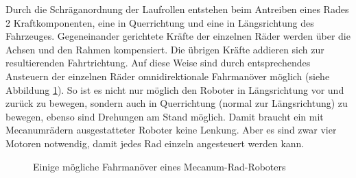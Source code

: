 \documentclass[a4paper,bibtotoc,oneside]{scrbook}
\begin{document}
Durch die Schräganordnung der Laufrollen entstehen beim Antreiben eines Rades 2 Kraftkomponenten, eine in Querrichtung und eine in Längsrichtung des Fahrzeuges. Gegeneinander gerichtete Kräfte der einzelnen Räder werden über die Achsen und den Rahmen kompensiert. Die übrigen Kräfte addieren sich zur resultierenden Fahrtrichtung. Auf diese Weise sind durch entsprechendes Ansteuern der einzelnen Räder omnidirektionale Fahrmanöver möglich (siehe Abbildung \ref{fahrman}). So ist es nicht nur möglich den Roboter in Längsrichtung vor und zurück zu bewegen, sondern auch in Querrichtung (normal zur Längsrichtung) zu bewegen, ebenso sind Drehungen am Stand möglich. Damit braucht ein mit Mecanumrädern ausgestatteter Roboter keine Lenkung. Aber es sind zwar vier Motoren notwendig, damit jedes Rad einzeln angesteuert werden kann.   

\begin{figure}
\caption{Einige mögliche Fahrmanöver eines Mecanum-Rad-Roboters}\label{fahrman}
\end{figure} 
\end{document}
